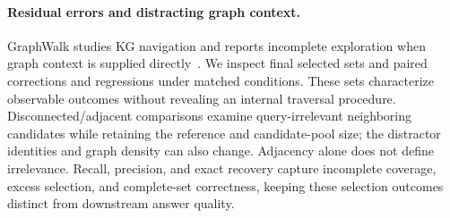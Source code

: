 \paragraph{Residual errors and distracting graph context.}
GraphWalk studies KG navigation and reports incomplete exploration when graph context is supplied directly~\cite{ghandi2026graphwalk}. We inspect final selected sets and paired corrections and regressions under matched conditions. These sets characterize observable outcomes without revealing an internal traversal procedure. Disconnected/adjacent comparisons examine query-irrelevant neighboring candidates while retaining the reference and candidate-pool size; the distractor identities and graph density can also change. Adjacency alone does not define irrelevance. Recall, precision, and exact recovery capture incomplete coverage, excess selection, and complete-set correctness, keeping these selection outcomes distinct from downstream answer quality.

